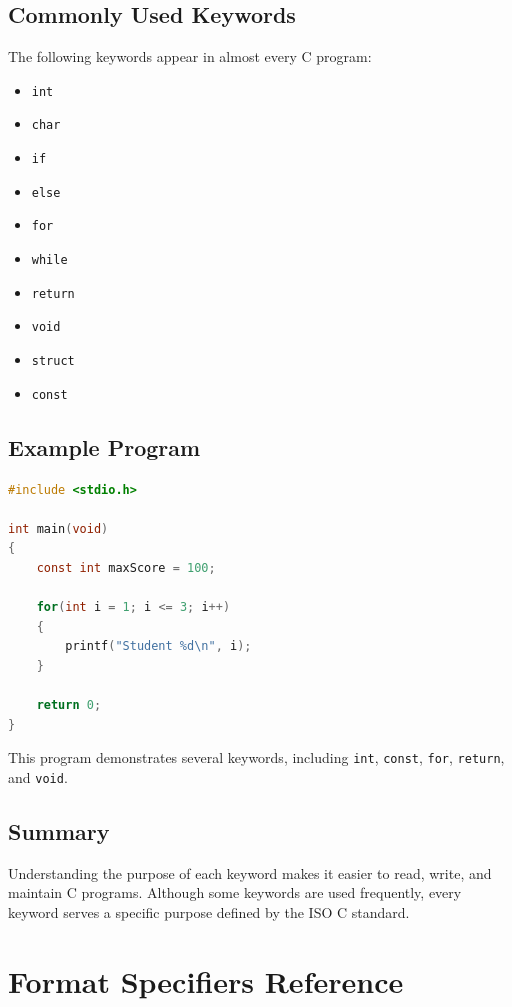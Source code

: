 \documentclass[12pt,openany]{book}
\begin{document}
\section{Commonly Used Keywords}

The following keywords appear in almost every C program:

\begin{itemize}
    \item \texttt{int}
    \item \texttt{char}
    \item \texttt{if}
    \item \texttt{else}
    \item \texttt{for}
    \item \texttt{while}
    \item \texttt{return}
    \item \texttt{void}
    \item \texttt{struct}
    \item \texttt{const}
\end{itemize}

\section{Example Program}

\begin{lstlisting}[language=C]
#include <stdio.h>

int main(void)
{
    const int maxScore = 100;

    for(int i = 1; i <= 3; i++)
    {
        printf("Student %d\n", i);
    }

    return 0;
}
\end{lstlisting}

This program demonstrates several keywords, including
\texttt{int}, \texttt{const}, \texttt{for}, \texttt{return}, and \texttt{void}.

\section{Summary}

Understanding the purpose of each keyword makes it easier to read, write, and maintain C programs. Although some keywords are used frequently, every keyword serves a specific purpose defined by the ISO C standard.
\chapter{Format Specifiers Reference}
\end{document}
